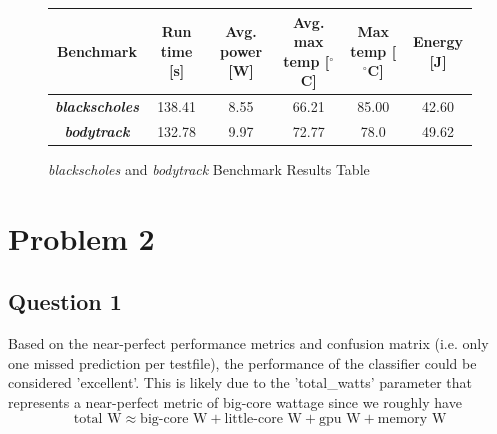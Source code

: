 \documentclass{article}
\begin{document}
\begin{figure} [!htb]
    \centering
    \caption{\textit{blackscholes} and \textit{bodytrack} Benchmark Results Table}
    \begin{tabular}[!htb]{|c|c|c|c|c|c|} \hline
        Benchmark & Run time [s] & Avg. power [W] & Avg. max temp [$^{\circ}$C] & Max temp [$^{\circ}$C] & Energy [J] \\ \hline
        \textit{\textbf{blackscholes}} & 138.41 & 8.55 & 66.21 & 85.00 & 42.60 \\ \hline
        \textit{\textbf{bodytrack}} & 132.78 & 9.97 & 72.77 & 78.0 & 49.62 \\ \hline
    \end{tabular}
    \label{fig:multithread-bench}
\end{figure}

\pagebreak

\section{Problem 2}

\subsection{Question 1}
Based on the near-perfect performance metrics and confusion matrix (i.e. only one missed prediction per testfile), the performance of the classifier could be considered 'excellent'. This is likely due to the 'total\_watts' parameter that represents a near-perfect metric of big-core wattage since we roughly have $$\text{total W} \approx \text{big-core W} + \text{little-core W} + \text{gpu W} + \text{memory W}$$
\end{document}
